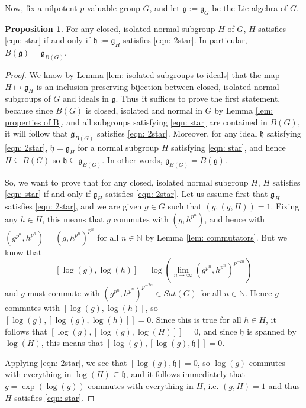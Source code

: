 \documentclass[12pt,a4paper]{article}
\theoremstyle{definition}
\newtheorem{propn}[thm]{Proposition}
\theoremstyle{remark}
\theoremstyle{custthm}
\begin{document}
Now, fix a nilpotent $p$-valuable group $G$, and let $\mathfrak{g}:=\mathfrak{g}_G$ be the Lie algebra of $G$.

\begin{propn}\label{propn: B(G) to B(g)}
For any closed, isolated normal subgroup $H$ of $G$, $H$ satisfies \eqref{eqn: star} if and only if $\mathfrak{h}:=\mathfrak{g}_H$ satisfies \eqref{eqn: 2star}. In particular, $B(\mathfrak{g})=\mathfrak{g}_{B(G)}$.
\end{propn}

\begin{proof}

We know by Lemma \ref{lem: isolated subgroups to ideals} that the map $H\mapsto\mathfrak{g}_H$ is an inclusion preserving bijection between closed, isolated normal subgroups of $G$ and ideals in $\mathfrak{g}$. Thus it suffices to prove the first statement, because since  $B(G)$ is closed, isolated and normal in $G$ by Lemma \ref{lem: properties of B}, and all subgroups satisfying \eqref{eqn: star} are contained in $B(G)$, it will follow that $\mathfrak{g}_{B(G)}$ satisfies \eqref{eqn: 2star}. Moreover, for any ideal $\mathfrak{h}$ satisfying \eqref{eqn: 2star}, $\mathfrak{h}=\mathfrak{g}_H$ for a normal subgroup $H$ satisfying \eqref{eqn: star}, and hence $H\subseteq B(G)$ so $\mathfrak{h}\subseteq \mathfrak{g}_{B(G)}$. In other words, $\mathfrak{g}_{B(G)}=B(\mathfrak{g})$.

So, we want to prove that for any closed, isolated normal subgroup $H$, $H$ satisfies \eqref{eqn: star} if and only if $\mathfrak{g}_H$ satisfies \eqref{eqn: 2star}. Let us assume first that $\mathfrak{g}_H$ satisfies \eqref{eqn: 2star}, and we are given $g\in G$ such that $(g,(g,H))=1$. Fixing any $h\in H$, this means that $g$ commutes with $(g,h^{p^n})$, and hence with $(g^{p^n},h^{p^n})=(g,h^{p^n})^{p^n}$ for all $n\in\mathbb{N}$ by Lemma \ref{lem: commutators}. But we know that $$[\log(g),\log(h)]=\log(\underset{n\rightarrow\infty}{\lim}(g^{p^n},h^{p^n})^{p^{-2n}})$$ and $g$ must commute with $(g^{p^n},h^{p^n})^{p^{-2n}}\in Sat(G)$ for all $n\in\mathbb{N}$. Hence $g$ commutes with $[\log(g),\log(h)]$, so $[\log(g),[\log(g),\log(h)]]=0$. Since this is true for all $h\in H$, it follows that $[\log(g),[\log(g),\log(H)]]=0$, and since $\mathfrak{h}$ is spanned by $\log(H)$, this means that $[\log(g),[\log(g),\mathfrak{h}]]=0$.

Applying \eqref{eqn: 2star}, we see that $[\log(g),\mathfrak{h}]=0$, so $\log(g)$ commutes with everything in $\log(H)\subseteq\mathfrak{h}$, and it follows immediately that $g=\exp(\log(g))$ commutes with everything in $H$, i.e. $(g,H)=1$ and thus $H$ satisfies \eqref{eqn: star}.


\end{proof}
\end{document}

